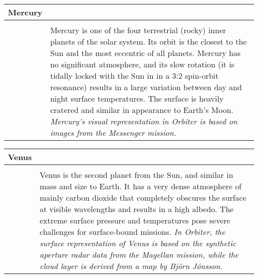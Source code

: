 \documentclass[Orbiter User Manual.tex]{subfiles}
\begin{document}
\begin{table}[H]
	\begin{tabularx}{\textwidth}{ |lX| }
	\hline\rule{0pt}{2ex}
	\textbf{Mercury} &\\
	\hline\rule{0pt}{2ex}
	\adjustbox{valign=t}{
		\begin{tabular}{ c }
		\texttt{[image: solsys\_mercury.jpg]}\\
		\end{tabular}
		}
	& \vfill
	Mercury is one of the four terrestrial (rocky) inner planets of the solar system. Its orbit is the closest to the Sun and the most eccentric of all planets.\newline
		Mercury has no significant atmosphere, and its slow rotation (it is tidally locked with the Sun in in a 3:2 spin-orbit resonance) results in a large variation between day and night surface temperatures. The surface is heavily cratered and similar in appearance to Earth’s Moon.\newline
		\newline
		\textit{Mercury’s visual representation in Orbiter is based on images from the Messenger mission.}\\
	\hline
	\end{tabularx}
\end{table}


\begin{table}[H]
	\begin{tabularx}{\textwidth}{ |lX| }
	\hline\rule{0pt}{2ex}
	\textbf{Venus} &\\
	\hline\rule{0pt}{2ex}
	\adjustbox{valign=t}{
		\begin{tabular}{ c }
		\texttt{[image: solsys\_venus.jpg]}\\
		\end{tabular}
		}
	& \vfill
	Venus is the second planet from the Sun, and similar in mass and size to Earth. It has a very dense atmosphere of mainly carbon dioxide that completely obscures the surface at visible wavelengths and results in a high albedo. The extreme surface pressure and temperatures pose severe challenges for surface-bound missions.\newline
		\newline
		\textit{In Orbiter, the surface representation of Venus is based on the synthetic aperture radar data from the Magellan mission, while the cloud layer is derived from a map by Björn Jónsson.}\\
	\hline
	\end{tabularx}
\end{table}
\end{document}
